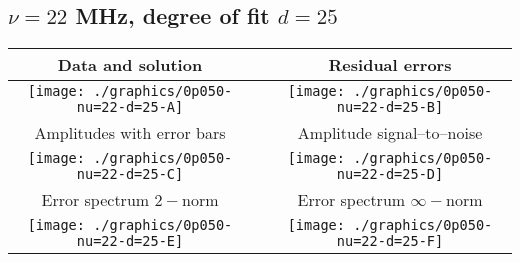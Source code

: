 

% 

\clearpage{}
\break{}

\subsection{$\nu = 22$ MHz, degree of fit $d = 25$}

\begin{table}[h]
    \begin{center}
        \begin{tabular}{ccc}
            Data and solution & \quad & Residual errors \\\hline
            \texttt{[image: ./graphics/0p050-nu=22-d=25-A]} &&
            \texttt{[image: ./graphics/0p050-nu=22-d=25-B]} \\[15pt]
            Amplitudes with error bars && Amplitude signal--to--noise \\\hline
            \texttt{[image: ./graphics/0p050-nu=22-d=25-C]} &&
            \texttt{[image: ./graphics/0p050-nu=22-d=25-D]} \\[15pt]
            Error spectrum $2-$norm && Error spectrum $\infty-$norm \\\hline
            \texttt{[image: ./graphics/0p050-nu=22-d=25-E]} &&
            \texttt{[image: ./graphics/0p050-nu=22-d=25-F]} \\[15pt]
        \end{tabular}
    \end{center}
\label{fig:elev=50, nu=22}
\end{table}



\endinput
